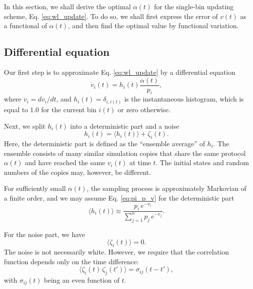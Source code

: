 \documentclass[reprint]{revtex4-1}
\begin{document}
In this section,
we shall derive the optimal $\alpha(t)$
for the single-bin updating scheme,
Eq. \eqref{eq:wl_update}.
%
To do so,
we shall first express the error of $v(t)$
as a functional of $\alpha(t)$,
and then find the optimal value
by functional variation.



\subsection{Differential equation}



Our first step is to approximate Eq. \eqref{eq:wl_update}
by a differential equation
%
\begin{equation}
  \dot v_i(t)
  =
  h_i(t) \frac{ \alpha(t) } { p_i },
  \label{eq:vt_diffeq}
\end{equation}
%
where
$\dot v_i = dv_i/dt$,
%
and $h_i(t) = \delta_{i, i(t)}$
is the instantaneous histogram,
which is equal to $1.0$
for the current bin $i(t)$
or zero otherwise.



Next, we split $h_i(t)$ into a deterministic part
and a noise
%
\begin{equation}
  h_i(t) = \langle h_i(t) \rangle + \zeta_i(t).
  \label{eq:h_split}
\end{equation}
%
Here, the deterministic part is defined
as the ``ensemble average'' of $h_i$.
%
The ensemble consists of many similar simulation copies
that share the same protocol $\alpha(t)$
and have reached the same $v_i(t)$
at time $t$.
%
The initial states and random numbers of the copies
may, however, be different.



For sufficiently small $\alpha(t)$,
the sampling process is approximately
Markovian of a finite order,
and we may assume Eq. \eqref{eq:pi_p_v}
for the deterministic part
%
\begin{equation}
  \langle h_i(t) \rangle
  \approx
  \frac{ p_i \, e^{-v_i} }
  { \sum_{j = 1}^n p_j \, e^{-v_j} }.
  \label{eq:h_ave}
\end{equation}



For the noise part, we have
%
\begin{equation}
  \langle \zeta_i(t) \rangle = 0.
  \label{eq:zeta_zeromean}
\end{equation}
%
The noise is not necessarily white.
However, we require that the correlation
function depends only on the time difference:
%
\begin{equation}
  \langle \zeta_i(t) \, \zeta_j(t') \rangle
  =
  \sigma_{ij}(t - t'),
  \label{eq:zeta_zeta_correlation}
\end{equation}
%
with $\sigma_{ij}(t)$ being an even function of $t$.
\end{document}
